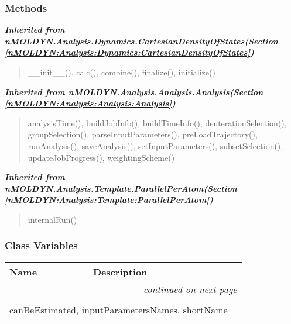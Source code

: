 
  \subsubsection{Methods}


\large{\textbf{\textit{Inherited from nMOLDYN.Analysis.Dynamics.CartesianDensityOfStates\textit{(Section \ref{nMOLDYN:Analysis:Dynamics:CartesianDensityOfStates})}}}}

\begin{quote}
\_\_init\_\_(), calc(), combine(), finalize(), initialize()
\end{quote}

\large{\textbf{\textit{Inherited from nMOLDYN.Analysis.Analysis.Analysis\textit{(Section \ref{nMOLDYN:Analysis:Analysis:Analysis})}}}}

\begin{quote}
analysisTime(), buildJobInfo(), buildTimeInfo(), deuterationSelection(), groupSelection(), parseInputParameters(), preLoadTrajectory(), runAnalysis(), saveAnalysis(), setInputParameters(), subsetSelection(), updateJobProgress(), weightingScheme()
\end{quote}

\large{\textbf{\textit{Inherited from nMOLDYN.Analysis.Template.ParallelPerAtom\textit{(Section \ref{nMOLDYN:Analysis:Template:ParallelPerAtom})}}}}

\begin{quote}
internalRun()
\end{quote}


  \subsubsection{Class Variables}

    \vspace{-1cm}
\hspace{\varindent}\begin{longtable}{|p{\varnamewidth}|p{\vardescrwidth}|l}
\cline{1-2}
\cline{1-2} \centering \textbf{Name} & \centering \textbf{Description}& \\
\cline{1-2}
\endhead\cline{1-2}\multicolumn{3}{r}{\small\textit{continued on next page}}\\\endfoot\cline{1-2}
\endlastfoot\multicolumn{2}{|l|}{\textit{Inherited from nMOLDYN.Analysis.Dynamics.CartesianDensityOfStates \textit{(Section \ref{nMOLDYN:Analysis:Dynamics:CartesianDensityOfStates})}}}\\
\multicolumn{2}{|p{\varwidth}|}{\raggedright canBeEstimated, inputParametersNames, shortName}\\
\cline{1-2}
\end{longtable}

